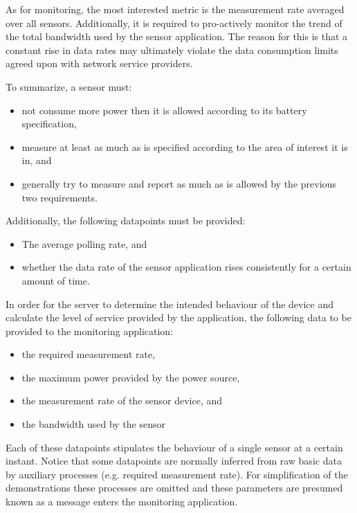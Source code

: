 As for monitoring, the most interested metric is the measurement rate averaged over all sensors. Additionally, it is required to pro-actively monitor the trend of the total bandwidth used by the sensor application. The reason for this is that a constant rise in data rates may ultimately violate the data consumption limits agreed upon with network service providers.

To summarize, a sensor must:
\begin{itemize}
\nospace
\item not consume more power then it is allowed according to its battery specification,
\item measure at least as much as is specified according to the area of interest it is in, and
\item generally try to measure and report as much as is allowed by the previous two requirements.
\end{itemize}
Additionally, the following datapoints must be provided:
\begin{itemize}
\nospace
\item The average polling rate, and
\item whether the data rate of the sensor application rises consistently for a certain amount of time.
\end{itemize}

In order for the server to determine the intended behaviour of the device and calculate the level of service provided by the application, the following data to be provided to the monitoring application:
\begin{itemize}
\nospace
\item the required measurement rate,
\item the maximum power provided by the power source,
\item the measurement rate of the sensor device, and
\item the bandwidth used by the sensor 
\end{itemize}
Each of these datapoints stipulates the behaviour of a single sensor at a certain instant. Notice that some datapoints are normally inferred from raw basic data by auxiliary processes (e.g. required measurement rate). For simplification of the demonstrations these processes are omitted and these parameters are presumed known as a message enters the monitoring application.


